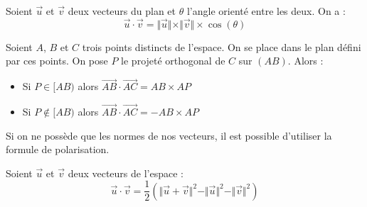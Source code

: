 	\begin{formula}
		Soient $\overrightarrow{u}$ et $\overrightarrow{v}$ deux vecteurs du plan et $\theta$ l'angle orienté entre les deux. On a :
		\[ \overrightarrow{u} \cdot \overrightarrow{v} = \Vert \overrightarrow{u} \Vert \times \Vert \overrightarrow{v} \Vert \times \cos(\theta) \]
	\end{formula}

	\begin{formula}
		Soient $A$, $B$ et $C$ trois points distincts de l'espace. On se place dans le plan défini par ces points. On pose $P$ le projeté orthogonal de $C$ sur $(AB)$. Alors :
		\begin{itemize}
			\item Si $P \in [AB)$ alors $\overrightarrow{AB} \cdot \overrightarrow{AC} = AB \times AP$
			\item Si $P \notin [AB)$ alors $\overrightarrow{AB} \cdot \overrightarrow{AC} = - AB \times AP$
		\end{itemize}
	\end{formula}

	Si on ne possède que les normes de nos vecteurs, il est possible d'utiliser la formule de polarisation.

	\begin{formula}
		Soient $\overrightarrow{u}$ et $\overrightarrow{v}$ deux vecteurs de l'espace :
		\[ \overrightarrow{u} \cdot \overrightarrow{v} = \frac{1}{2} \left(\Vert \overrightarrow{u} + \overrightarrow{v} \Vert^2 - \Vert \overrightarrow{u} \Vert^2 - \Vert \overrightarrow{v} \Vert^2\right) \]
	\end{formula}

